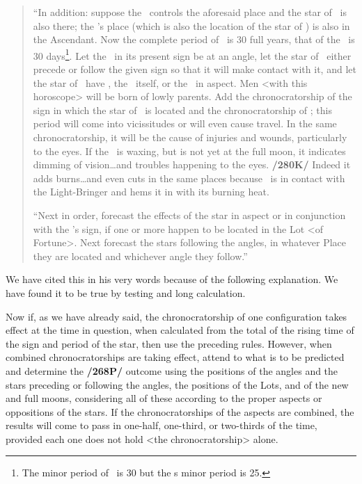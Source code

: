 \begin{quote}
“In addition: suppose the \Moon\, controls the aforesaid place and the star of \Saturn\, is also there; the \Moon’s place (which is also the location of the star of \Saturn) is also in the Ascendant. Now the
complete period of \Saturn\, is 30 full years, that of the \Moon\, is 30 days\footnote{The minor period of \Saturn\, is 30 but the \Moon
s minor period is 25.}. Let the \Moon\, in its present sign be at an angle, let the star of \Mars\, either precede or follow the given sign so that it will make contact with it, and let the star of \Saturn\, have \Mars, the \Moon\, itself, or the \Sun\, in aspect. Men <with this horoscope> will be born of lowly parents. Add the chronocratorship of the sign in which the star of \Saturn\, is located and the chronocratorship of \Mars; this period will come into vicissitudes or will even cause travel. In the same chronocratorship, it will be the cause of injuries and wounds, particularly to the eyes. If the \Moon\, is waxing, but is not yet at the full moon, it indicates dimming of vision…and troubles happening to the eyes. \textbf{/280K/} Indeed it adds burns…and even cuts in the same places because \Mars\, is in contact with the Light-Bringer and hems it in with its burning heat.

“Next in order, forecast the effects of the star in aspect or in conjunction with the \Moon’s sign, if one or more happen to be located in the Lot <of Fortune>. Next forecast the stars following the
angles, in whatever Place they are located and whichever angle they follow.”
\end{quote}

We have cited this in his very words because of the following explanation. We have found it to be true by testing and long calculation.

Now if, as we have already said, the chronocratorship of one configuration takes effect at the time in question, when calculated from the total of the rising time of the sign and period of the star, then use the preceding rules. However, when combined chronocratorships are taking effect, attend to what is to be
predicted and determine the \textbf{/268P/} outcome using the positions of the angles and the stars preceding or following the angles, the positions of the Lots, and of the new and full moons, considering all of these according to the proper aspects or oppositions of the stars. 
If the chronocratorships of the aspects are combined, the results will come to pass in one-half, one-third, or two-thirds of the time, provided each one does not hold <the chronocratorship> alone.

